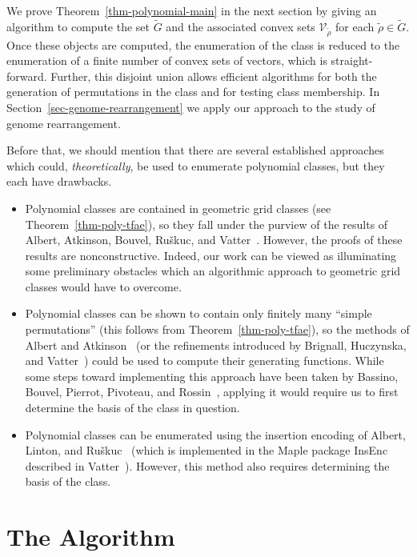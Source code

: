 \documentclass[10pt]{article}
\theoremstyle{plain}
\theoremstyle{definition}
\begin{document}
We prove Theorem~\ref{thm-polynomial-main} in the next section by giving an algorithm to compute the set $\tilde{G}$ and the associated convex sets $\mathcal{V}_{\tilde{\rho}}$ for each $\tilde{\rho}\in\tilde{G}$. Once these objects are computed, the enumeration of the class is reduced to the enumeration of a finite number of convex sets of vectors, which is straight-forward. 
Further, this disjoint union allows efficient algorithms for both the generation of permutations in the class and for testing class membership.
In Section~\ref{sec-genome-rearrangement} we apply our approach to the study of genome rearrangement.


Before that, we should mention that there are several established approaches which could, \emph{theoretically}, be used to enumerate polynomial classes, but they each have drawbacks. 
\begin{itemize}
\item Polynomial classes are contained in geometric grid classes (see Theorem~\ref{thm-poly-tfae}), so they fall under the purview of the results of Albert, Atkinson, Bouvel, Ru\v{s}kuc, and Vatter~\cite{albert:geometric-grid-:}. However, the proofs of these results are nonconstructive. Indeed, our work can be viewed as illuminating some preliminary obstacles which an algorithmic approach to geometric grid classes would have to overcome.
\item Polynomial classes can be shown to contain only finitely many ``simple permutations'' (this follows from Theorem~\ref{thm-poly-tfae}), so the methods of Albert and Atkinson~\cite{albert:simple-permutat:} (or the refinements introduced by Brignall, Huczynska, and Vatter~\cite{brignall:simple-permutat:}) could be used to compute their generating functions. While some steps toward implementing this approach have been taken by Bassino, Bouvel, Pierrot, Pivoteau, and Rossin~\cite{bassino:combinatorial-s:}, applying it would require us to first determine the basis of the class in question.
\item Polynomial classes can be enumerated using the insertion encoding of Albert, Linton, and Ru\v{s}kuc~\cite{albert:the-insertion-e:} (which is implemented in the Maple package {\sc InsEnc} described in Vatter~\cite{vatter:finding-regular:}). However, this method also requires determining the basis of the class.
\end{itemize}

%
%
%
%
%
%
%
%
\section{The Algorithm}
\end{document}
